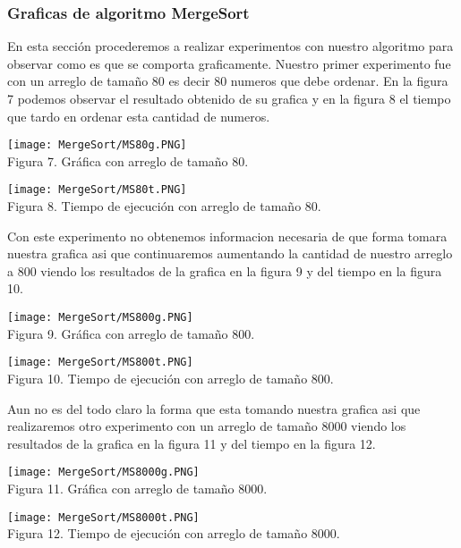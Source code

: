 \documentclass[12pt,twoside]{article}
\begin{document}
\subsubsection{Graficas de algoritmo MergeSort}
En esta secci\'on procederemos a realizar experimentos con nuestro algoritmo para observar como es que se comporta graficamente.
Nuestro primer experimento fue con un arreglo de tamaño 80 es decir 80 numeros que debe ordenar. En la figura 7 podemos observar el resultado obtenido de su grafica y en la figura 8 el tiempo que tardo en ordenar esta cantidad de numeros.
\begin{center}
    \texttt{[image: MergeSort/MS80g.PNG]}\\
    Figura 7. Gr\'afica con arreglo de tamaño 80.
\end{center}
\begin{center}
    \texttt{[image: MergeSort/MS80t.PNG]}\\
    Figura 8. Tiempo de ejecuci\'on con arreglo de tamaño 80.
\end{center}
Con este experimento no obtenemos informacion necesaria de que forma tomara nuestra grafica asi que continuaremos aumentando la cantidad de nuestro arreglo a 800 viendo los resultados de la grafica en la figura 9 y del tiempo en la figura 10.
\begin{center}
    \texttt{[image: MergeSort/MS800g.PNG]}\\
    Figura 9. Gr\'afica con arreglo de tamaño 800.
\end{center}
\begin{center}
    \texttt{[image: MergeSort/MS800t.PNG]}\\
    Figura 10. Tiempo de ejecuci\'on con arreglo de tamaño 800.
\end{center}
Aun no es del todo claro la forma que esta tomando nuestra grafica asi que realizaremos otro experimento con un arreglo de tamaño 8000 viendo los resultados de la grafica en la figura 11 y del tiempo en la figura 12.
\begin{center}
    \texttt{[image: MergeSort/MS8000g.PNG]}\\
    Figura 11. Gr\'afica con arreglo de tamaño 8000.
\end{center}
\begin{center}
    \texttt{[image: MergeSort/MS8000t.PNG]}\\
    Figura 12. Tiempo de ejecuci\'on con arreglo de tamaño 8000.
\end{center}
\end{document}
